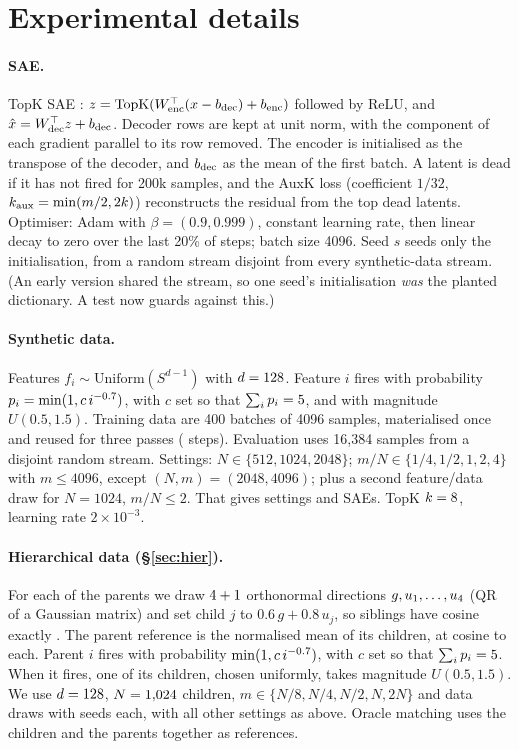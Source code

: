 \section{Experimental details}
\label{app:details}

\paragraph{SAE.} TopK SAE \citep{gao2024scaling}: $z=\mathrm{TopK}(W_{\rm enc}^\top(x-b_{\rm dec})+b_{\rm enc})$ followed by ReLU, and $\hat x=W_{\rm dec}^\top z+b_{\rm dec}$. Decoder rows are kept at unit norm, with the component of each gradient parallel to its row removed. The encoder is initialised as the transpose of the decoder, and $b_{\rm dec}$ as the mean of the first batch. A latent is dead if it has not fired for 200k samples, and the AuxK loss (coefficient $1/32$, $k_{\rm aux}=\min(m/2,2k)$) reconstructs the residual from the top dead latents. Optimiser: Adam with $\beta=(0.9,0.999)$, constant learning rate, then linear decay to zero over the last 20\% of steps; batch size 4096. Seed $s$ seeds only the initialisation, from a random stream disjoint from every synthetic-data stream. (An early version shared the stream, so one seed's initialisation \emph{was} the planted dictionary. A test now guards against this.)

\paragraph{Synthetic data.} Features $f_i\sim\mathrm{Uniform}(S^{d-1})$ with $d=128$. Feature $i$ fires with probability $p_i=\min(1,c\,i^{-0.7})$, with $c$ set so that $\sum_ip_i=5$, and with magnitude $U(0.5,1.5)$. Training data are 400 batches of 4096 samples, materialised once and reused for three passes (\SynSteps{} steps). Evaluation uses 16{,}384 samples from a disjoint random stream. Settings: $N\in\{512,1024,2048\}$; $m/N\in\{1/4,1/2,1,2,4\}$ with $m\le4096$, except $(N,m)=(2048,4096)$; plus a second feature/data draw for $N=1024$, $m/N\le2$. That gives \SynFamilies{} settings and \SynRuns{} SAEs. TopK $k=8$, learning rate $2\times10^{-3}$.

\paragraph{Hierarchical data (\S\ref{sec:hier}).} For each of the \HierParents{} parents we draw $4+1$ orthonormal directions $g,u_1,\dots,u_{4}$ (QR of a Gaussian matrix) and set child $j$ to $0.6\,g+0.8\,u_j$, so siblings have cosine exactly \HierSiblingCos{}. The parent reference is the normalised mean of its children, at cosine \HierParentCos{} to each. Parent $i$ fires with probability $\min(1,c\,i^{-0.7})$, with $c$ set so that $\sum_ip_i=5$. When it fires, one of its children, chosen uniformly, takes magnitude $U(0.5,1.5)$. We use $d=128$, $N=1{,}024$ children, $m\in\{N/8,N/4,N/2,N,2N\}$ and \HierDraws{} data draws with \SynSeeds{} seeds each, with all other settings as above. Oracle matching uses the children and the parents together as references.


